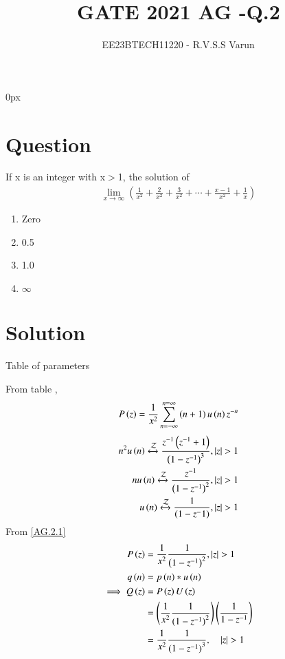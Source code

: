 \documentclass[beamer]{IEEEtran}
\theoremstyle{remark}
\begin{document}
\parindent 0px


\title{GATE 2021 AG -Q.2}
\author{EE23BTECH11220 - R.V.S.S Varun$^{}$%
}
\maketitle
\newpage
\bigskip

\renewcommand{\thefigure}{\theenumi}
\renewcommand{\thetable}{\theenumi}
\section*{Question}
If x is an integer with  x$>$1, the solution of 
\begin{align*}
\lim_{x\to\infty}\left(\frac{1}{x^2}+\frac{2}{x^2}+\frac{3}{x^2}+\cdots+\frac{x-1}{x^2}+\frac{1}{x}\right)
\end{align*}
\begin{enumerate}[label=\alph*)]
\item Zero 
\item 0.5 
\item 1.0 
\item $\infty$  \hfill{}
\end{enumerate}
\section*{Solution}

\begin{table}[h]
    \centering
   
 \caption{Table of parameters}
    \label{tab:AG.2.1}
\end{table}

From table ,
\begin{align}
	P\left(z\right)=\frac{1}{x^2}\sum_{n=-\infty}^{n=\infty}\left(n+1\right)u\left(n\right)z^{-n} \label{AG.2.1}
\end{align}
\begin{align}
	n^2 u\left(n\right)\xleftrightarrow{\mathcal{Z}} \frac{z^{-1}\left(z^{-1}+1\right)}{\left(1-z^{-1}\right)^3} ,  \left\vert z\right\vert > 1 \label{ag.2.1}\\
	n u\left(n\right)\xleftrightarrow{\mathcal{Z}} \frac{z^{-1}}{\left(1-z^{-1}\right)^2} ,   \left\vert z\right\vert >1 \label{ag.2.2}\\
   u\left(n\right)\xleftrightarrow{\mathcal{Z}} \frac{1}{\left(1-z^-1\right)} ,   \left\vert z\right\vert >1  \label{ag.2.3}
\end{align}
From \eqref{AG.2.1}
\begin{align}
	P\left(z\right)&=\frac{1}{x^2}\frac{1}{\left(1-z^{-1}\right)^2} , \left\vert z\right\vert >1\\
	q\left(n\right)&=p\left(n\right)\ast u\left(n\right)\\
	\implies Q\left(z\right)&=P\left(z\right)U\left(z\right)   \\
	&=\left(\frac{1}{x^2}\frac{1}{({1-z^{-1})}^{2}}\right)\left(\frac{1}{1-z^{-1}}\right)  \\
	 &=\frac{1}{x^2}\frac{1}{({1-z^{-1})}^{3}} ,\quad \left\vert z\right\vert>1 \label{ag.2.4}
\end{align}
\end{document}
